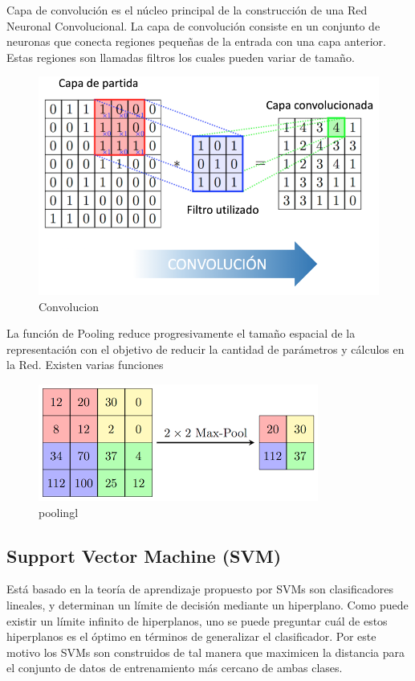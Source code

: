 \documentclass[a4paper,11pt]{report}
\begin{document}
Capa de convolución es el núcleo principal de la construcción de una Red Neuronal Convolucional. La capa de convolución consiste en un conjunto de neuronas que conecta regiones pequeñas de la entrada con una capa anterior. Estas regiones son llamadas filtros los cuales pueden variar de tamaño.

\begin{figure}[h]
 \centering
  \includegraphics[scale=0.4]{convolucion}
  \caption{Convolucion}
  \label{fig:Convolucion}
\end{figure}



La función de Pooling reduce progresivamente el tamaño espacial de la representación con el objetivo de reducir la cantidad de parámetros y cálculos en la Red. Existen varias funciones

\begin{figure}[h]
 \centering
  \includegraphics[scale=0.4]{pooling}
  \caption{poolingl}
  \label{fig:pooling}
\end{figure}

\subsection{Support Vector Machine (SVM)}
Está basado en la teoría de aprendizaje propuesto por SVMs son clasificadores lineales, y determinan un límite de decisión mediante un hiperplano. Como puede existir un límite infinito de hiperplanos, uno se puede preguntar cuál de estos hiperplanos es el óptimo en términos de generalizar el clasificador. Por este motivo los SVMs son construidos de tal manera que maximicen la distancia para el conjunto de datos de entrenamiento más cercano de ambas clases.
\end{document}
